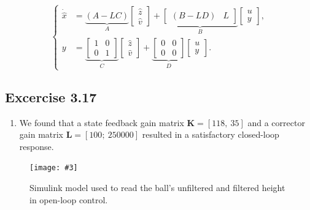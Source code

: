 \documentclass[10pt,twoside,openright]{article}
\newcommand{\mijnfiguur}[5][ht]{            %
    \begin{figure}[#1]                      %
        \begin{center}                      %
            \texttt{[image: \#3]}        %
        \end{center}
        \caption{#4\label{#5}}          %
    \end{figure}
    }
\begin{document}
\begin{enumerate}
\begin{equation}
\begin{cases}
 \dot{\hat{x}} &= \underbrace{(A - LC)}_{A} \begin{bmatrix}\hat{z}\\\hat{v}\end{bmatrix} + \underbrace{\begin{bmatrix}(B - LD) & L\end{bmatrix}}_{B} \begin{bmatrix}u\\y\end{bmatrix},\\[3em]
y &= \underbrace{\begin{bmatrix}1&0\\0&1\end{bmatrix}}_{C} \begin{bmatrix}\hat{z}\\\hat{v}\end{bmatrix} + \underbrace{\begin{bmatrix}0&0\\0&0\end{bmatrix}}_{D} \begin{bmatrix}u\\y\end{bmatrix}.
\end{cases}
\end{equation}	
	
\end{enumerate}

\subsection*{Excercise 3.17}
\begin{enumerate}
	\setlength\itemsep{0em}
	\item We found that a state feedback gain matrix $\bm{K} = [118,~ 35]$ and a corrector gain matrix $\bm{L} = [100;~ 250000]$ resulted in a satisfactory closed-loop response.
\end{enumerate}


\mijnfiguur[h!]{width=\linewidth}{readProximity_sol.pdf}{Simulink model used to read the ball's unfiltered and filtered height in open-loop control.}{fig:readProximity_sol}
\end{document}
